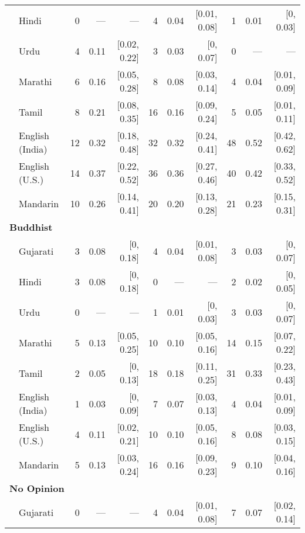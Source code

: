 \begin{table}[t]
\begin{footnotesize}
\begin{tabular}{p{.1in}lrrrrrrrrr}
 & Hindi & 0 & --- & --- & 4 & 0.04 & [0.01, 0.08] & 1 & 0.01 & [0, 0.03]\\

 & Urdu & 4 & 0.11 & [0.02, 0.22] & 3 & 0.03 & [0, 0.07] & 0 & --- & ---\\

 & Marathi & 6 & 0.16 & [0.05, 0.28] & 8 & 0.08 & [0.03, 0.14] & 4 & 0.04 & [0.01, 0.09]\\

 & Tamil & 8 & 0.21 & [0.08, 0.35] & 16 & 0.16 & [0.09, 0.24] & 5 & 0.05 & [0.01, 0.11]\\

 & English (India) & 12 & 0.32 & [0.18, 0.48] & 32 & 0.32 & [0.24, 0.41] & 48 & 0.52 & [0.42, 0.62]\\

 & English (U.S.) & 14 & 0.37 & [0.22, 0.52] & 36 & 0.36 & [0.27, 0.46] & 40 & 0.42 & [0.33, 0.52]\\
& Mandarin & 10 & 0.26 & [0.14, 0.41] & 20 & 0.20 & [0.13, 0.28] & 21 & 0.23 & [0.15, 0.31]\\
 \midrule
\multicolumn{11}{l}{\textbf{Buddhist}}\\
& Gujarati & 3 & 0.08 & [0, 0.18] & 4 & 0.04 & [0.01, 0.08] & 3 & 0.03 & [0, 0.07]\\

 & Hindi & 3 & 0.08 & [0, 0.18] & 0 & --- & --- & 2 & 0.02 & [0, 0.05]\\

 & Urdu & 0 & --- & --- & 1 & 0.01 & [0, 0.03] & 3 & 0.03 & [0, 0.07]\\

 & Marathi & 5 & 0.13 & [0.05, 0.25] & 10 & 0.10 & [0.05, 0.16] & 14 & 0.15 & [0.07, 0.22]\\

 & Tamil & 2 & 0.05 & [0, 0.13] & 18 & 0.18 & [0.11, 0.25] & 31 & 0.33 & [0.23, 0.43]\\

 & English (India) & 1 & 0.03 & [0, 0.09] & 7 & 0.07 & [0.03, 0.13] & 4 & 0.04 & [0.01, 0.09]\\

 & English (U.S.) & 4 & 0.11 & [0.02, 0.21] & 10 & 0.10 & [0.05, 0.16] & 8 & 0.08 & [0.03, 0.15]\\

& Mandarin & 5 & 0.13 & [0.03, 0.24] & 16 & 0.16 & [0.09, 0.23] & 9 & 0.10 & [0.04, 0.16]\\
 \midrule
\multicolumn{11}{l}{\textbf{No Opinion}}\\
& Gujarati & 0 & --- & --- & 4 & 0.04 & [0.01, 0.08] & 7 & 0.07 & [0.02, 0.14]\\


\end{tabular}
\end{footnotesize}
\end{table}
